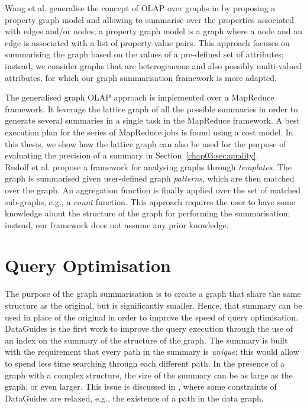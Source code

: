 Wang et al. generalise the concept of OLAP over graphs in \cite{zhengkui:2014:ppg} by proposing a property graph model and allowing to summarise over the properties associated with edges and/or nodes; a property graph model is a graph where a node and an edge is associated with a list of property-value pairs. This approach focuses on summarising the graph based on the values of a pre-defined set of attributes; instead, we consider graphs that are heterogeneous and also possibly multi-valued attributes, for which our graph summarisation framework is more adapted.

The generalised graph OLAP approach \cite{zhengkui:2014:ppg} is implemented over a MapReduce \cite{dean:2008:msd} framework. It leverage the lattice graph of all the possible summaries in order to generate several summaries in a single task in the MapReduce framework. A best execution plan for the series of MapReduce jobs is found using a cost model. In this thesis, we show how the lattice graph can also be used for the purpose of evaluating the precision of a summary in Section~\ref{chap03:sec:quality}.\\

Rudolf et al. \cite{rudolf:2013:slg} propose a framework for analysing graphs through \emph{templates}. The graph is summarised given user-defined graph \emph{patterns}, which are then matched over the graph. An aggregation function is finally applied over the set of matched sub-graphs, e.g., a \emph{count} function. This approach requires the user to have some knowledge about the structure of the graph for performing the summarisation; instead, our framework does not assume any prior knowledge.

\section{Query Optimisation}
\label{chap03:review:query-optim}

The purpose of the graph summarisation is to create a graph that share the same structure as the original, but is significantly smaller. Hence, that summary can be used in place of the original in order to improve the speed of query optimisation.\\

DataGuides \cite{goldman1997dataguides} is the first work to improve the query execution through the use of an index on the summary of the structure of the graph. The summary is built with the requirement that every path in the summary is \emph{unique}; this would allow to spend less time searching through each different path. In the presence of a graph with a complex structure, the size of the summary can be as large as the graph, or even larger. This issue is discussed in \cite{goldman1999approximate}, where some constraints of DataGuides are relaxed, e.g., the existence of a path in the data graph.\\

